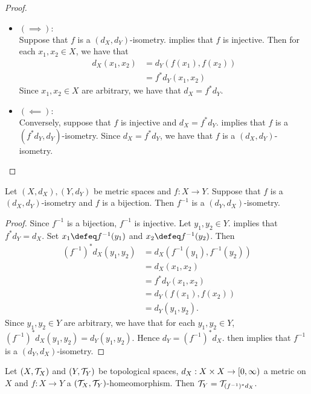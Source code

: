 \documentclass{book}
\begin{document}
\begin{proof}
	\begin{itemize}
		\item $(\implies):$ \\
		Suppose that $f$ is a $(d_X, d_Y)$-isometry.  implies that $f$ is injective. Then for each $x_1, x_2 \in X$, we have that
		\begin{align*}
			d_X(x_1, x_2)
			& = d_Y(f(x_1), f(x_2)) \\
			& = f^*d_Y(x_1, x_2)
		\end{align*}
		Since $x_1, x_2 \in X$ are arbitrary, we have that $d_X = f^*d_Y$. 
		\item $(\impliedby):$ \\
		Conversely, suppose that  $f$ is injective and $d_X = f^*d_Y$.  implies that $f$ is a $(f^*d_Y, d_Y)$-isometry. Since $d_X = f^*d_Y$, we have that $f$ is a $(d_X, d_Y)$-isometry.
	\end{itemize}
\end{proof}

\begin{ex} 
	Let $(X, d_X), (Y, d_Y)$ be metric spaces and $f:X \rightarrow Y$. Suppose that $f$ is a $(d_X, d_Y)$-isometry and $f$ is a bijection. Then $f^{-1}$ is a $(d_Y, d_X)$-isometry.
\end{ex}

\begin{proof}
	Since $f^{-1}$ is a bijection, $f^{-1}$ is injective. Let $y_1, y_2 \in Y$.  implies that $f^*d_Y = d_X$. Set $x_1 \defeq f^{-1}(y_1)$ and $x_2 \defeq f^{-1}(y_2)$. Then 
	\begin{align*}
		(f^{-1})^*d_X(y_1, y_2)
		& = d_X(f^{-1}(y_1), f^{-1}(y_2)) \\
		& = d_X(x_1, x_2) \\
		& = f^*d_Y(x_1, x_2) \\
		& = d_Y(f(x_1), f(x_2)) \\
		& = d_Y(y_1, y_2).
	\end{align*}
	Since $y_1, y_2 \in Y$ are arbitrary, we have that for each $y_1, y_2 \in Y$, $(f^{-1})^*d_X(y_1, y_2) = d_Y(y_1, y_2)$. Hence $d_Y = (f^{-1})^*d_X$.  then implies that $f^{-1}$ is a $(d_Y, d_X)$-isometry.
\end{proof}

\begin{ex} 
	Let $(X, \mathcal{T}_X)$ and $(Y, \mathcal{T}_Y)$ be topological spaces, $d_X: X \times X \rightarrow [0,\infty)$ a metric on $X$ and $f:X \rightarrow Y$ a $(\mathcal{T}_X, \mathcal{T}_Y)$-homeomorphism. Then $\mathcal{T}_Y = \mathcal{T}_{(f^{-1})^*d_X}$.
\end{ex}
\end{document}
